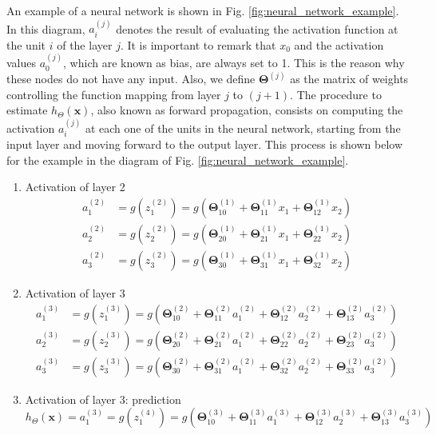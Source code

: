\documentclass[a4paper, report, oneside, UKenglish]{memoir}
\newcommand{\x}{\boldsymbol{x}}
\newcommand{\bTheta}{\boldsymbol{\Theta}}
\begin{document}
An example of a neural network is shown in Fig. \ref{fig:neural_network_example}. In this diagram, $a_i^{(j)}$ denotes the result of evaluating the activation function at the unit $i$ of the layer $j$. It is important to remark that $x_0$ and the activation values $a_0^{(j)}$, which are known as bias, are always set to 1. This is the reason why these nodes do not have any input. Also, we define $\bTheta^{(j)}$ as the matrix of weights controlling the function mapping from layer $j$ to $(j+1)$. The procedure to estimate $h_\Theta(\x)$, also known as forward propagation, consists on computing the activation $a_i^{(j)}$ at each one of the units in the neural network, starting from the input layer and moving forward to the output layer. This process is shown below for the example in the diagram of Fig. \ref{fig:neural_network_example}.

\begin{enumerate}
    \item Activation of layer 2
    \begin{equation}
    \begin{split}
        a_1^{(2)} &= g(z_1^{(2)}) = g(\bTheta_{10}^{(1)} + \bTheta_{11}^{(1)} x_1 + \bTheta_{12}^{(1)} x_2) \\
        a_2^{(2)} &= g(z_2^{(2)}) = g(\bTheta_{20}^{(1)} + \bTheta_{21}^{(1)} x_1 + \bTheta_{22}^{(1)} x_2) \\
        a_3^{(2)} &= g(z_3^{(2)}) = g(\bTheta_{30}^{(1)} + \bTheta_{31}^{(1)} x_1 + \bTheta_{32}^{(1)} x_2)
    \end{split}
    \end{equation}
    \item Activation of layer 3
    \begin{equation}
    \begin{split}
        a_1^{(3)} &= g(z_1^{(3)}) = g(\bTheta_{10}^{(2)} + \bTheta_{11}^{(2)} a_1^{(2)} + \bTheta_{12}^{(2)} a_2^{(2)} + \bTheta_{13}^{(2)} a_3^{(2)}) \\
        a_2^{(3)} &= g(z_2^{(3)}) = g(\bTheta_{20}^{(2)} + \bTheta_{21}^{(2)} a_1^{(2)} + \bTheta_{22}^{(2)} a_2^{(2)} + \bTheta_{23}^{(2)} a_3^{(2)}) \\
        a_3^{(3)} &= g(z_3^{(3)}) = g(\bTheta_{30}^{(2)} + \bTheta_{31}^{(2)} a_1^{(2)} + \bTheta_{32}^{(2)} a_2^{(2)} + \bTheta_{33}^{(2)} a_3^{(2)})
    \end{split}
    \end{equation}
    \item Activation of layer 3: prediction
    \begin{equation}\label{eq:nn_cost_function}
        h_\Theta(\x) = a_1^{(3)} = g(z_1^{(4)}) = g(\bTheta_{10}^{(3)} + \bTheta_{11}^{(3)} a_1^{(3)} + \bTheta_{12}^{(3)} a_2^{(3)} + \bTheta_{13}^{(3)} a_3^{(3)})
    \end{equation}
\end{enumerate}
\end{document}
